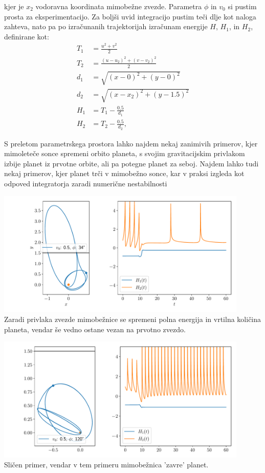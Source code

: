 kjer je $x_2$ vodoravna koordinata mimobežne zvezde. Parametra $\phi$ in $v_0$
si pustim prosta za eksperimentacijo. Za boljši uvid integracijo pustim teči
dlje kot naloga zahteva, nato pa po izračunanih trajektorijah izračunam energije
$H$, $H_1$, in $H_2$, definirane kot:
\begin{align*}
    T_1 & = \frac{u^2 +v^2}{2}               \\
    T_2 & = \frac{(u-u_2)^2 + (v-v_2)^2}{2}  \\
    d_1 & = \sqrt{(x - 0)^2 + (y - 0)^2}     \\
    d_2 & = \sqrt{(x - x_2)^2 + (y - 1.5)^2} \\
    H_1 & = T_1 - \frac{0.5}{d_1}            \\
    H_2 & = T_2 - \frac{0.5}{d_2},
\end{align*}


S preletom parametrskega prostora lahko najdem nekaj zanimivih primerov, kjer
mimoleteče sonce spremeni orbito planeta, s svojim gravitacijskim privlakom
izbije planet iz prvotne orbite, ali pa potegne planet za seboj. Najdem lahko tudi nekaj primerov, kjer
planet trči v mimobežno sonce, kar v praksi izgleda kot odpoved integratorja zaradi numerične nestabilnosti

\begin{center}
    \includegraphics[width=0.9\textwidth]{../images/3-1-3.pdf}\\
    Zaradi privlaka zvezde mimobežnice se spremeni polna energija in vrtilna količina planeta,
    vendar še vedno ostane vezan na prvotno zvezdo.
\end{center}
\begin{center}
    \includegraphics[width=0.9\textwidth]{../images/3-1-6_.pdf}\\
    Sličen primer, vendar v tem primeru mimobežnica 'zavre' planet.
\end{center}

